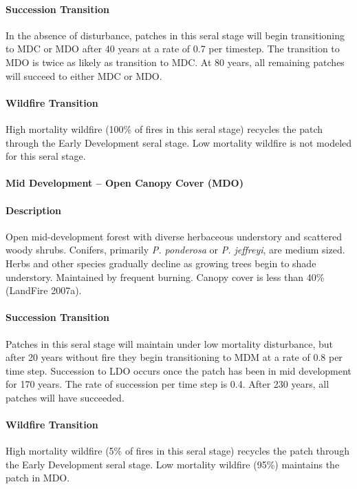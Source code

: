 \paragraph{Succession Transition} In the absence of disturbance, patches in this seral stage will begin transitioning to MDC or MDO after 40 years at a rate of 0.7 per timestep. The transition to MDO is twice as likely as transition to MDC.  At 80 years, all remaining patches will succeed to either MDC or MDO. 

\paragraph{Wildfire Transition} High mortality wildfire (100\% of fires in this seral stage) recycles the patch through the Early Development seral stage. Low mortality wildfire is not modeled for this seral stage. 

\noindent\hrulefill


\paragraph{Mid Development – Open Canopy Cover (MDO)}

\paragraph{Description} Open mid-development forest with diverse herbaceous understory and scattered woody shrubs. Conifers, primarily \emph{P. ponderosa} or \emph{P. jeffreyi}, are medium sized. Herbs and other species gradually decline as growing trees begin to shade understory. Maintained by frequent burning. Canopy cover is less than 40\% (LandFire 2007a). 

\paragraph{Succession Transition} Patches in this seral stage will maintain under low mortality disturbance, but after 20 years without fire they begin transitioning to MDM at a rate of 0.8 per time step. Succession to LDO occurs once the patch has been in mid development for 170 years. The rate of succession per time step is 0.4. After 230 years, all patches will have succeeded.

\paragraph{Wildfire Transition} High mortality wildfire (5\% of fires in this seral stage) recycles the patch through the Early Development seral stage. Low mortality wildfire (95\%) maintains the patch in MDO.

